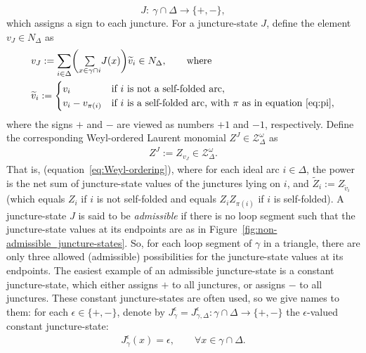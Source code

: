 \documentclass[10pt,a4paper]{amsart}
\numberwithin{equation}{section}
\theoremstyle{definition}
\newcommand{\til}[1]{\widetilde{#1}}
\begin{document}
\[
J \colon \ \gamma \cap \Delta \to \{+,-\},
\]
which assigns a sign to each juncture. For a juncture-state $J$, define the element $v_J \in N_\Delta$ as
\begin{align}
\label{eq:v_J}
&v_J := \sum_{i\in \Delta} \biggl( \underset{x\in \gamma \cap i}{\textstyle \sum} J(x) \biggr) \til{v}_i \in N_\Delta, \qquad \mbox{where} \\
\label{eq:til_v_i}
&\til{v}_i := \begin{cases}
v_i & \mbox{if } i \mbox{ is not a self-folded arc}, \\
v_i - v_{\pi(i)} & \mbox{if } i \mbox{ is a self-folded arc, with } \pi \mbox{ as in equation}~\eqref{eq:pi},
\end{cases}
\end{align}
where the signs $+$ and $-$ are viewed as numbers $+1$ and $-1$, respectively. Define the corresponding Weyl-ordered Laurent monomial $Z^J \in \mathcal{Z}^\omega_\Delta$ as
\begin{align}
\label{eq:Z_J}
Z^J := Z_{v_J} \in \mathcal{Z}^\omega_\Delta.
\end{align}
That is, \smash{$Z^J = \bigl[ \prod_{i \in \Delta} \til{Z}_i^{a_i} \bigr]_{\rm Weyl}$} (equation~\eqref{eq:Weyl-ordering}), where for each ideal arc $i\in \Delta$, the power  is the net sum of juncture-state values of the junctures lying on $i$, and $\til{Z}_i := Z_{\til{v}_i}$ (which equals $Z_i$ if $i$ is not self-folded and equals $Z_i Z_{\pi(i)}$ if $i$ is self-folded).
A juncture-state $J$ is said to be {\em admissible} if there is no loop segment such that the juncture-state values at its endpoints are as in Figure~\ref{fig:non-admissible_juncture-states}. So, for each loop segment of $\gamma$ in a triangle, there are only three allowed (admissible) possibilities for the juncture-state values at its endpoints. The easiest example of an admissible juncture-state is a constant juncture-state, which either assigns $+$ to all junctures, or assigns $-$ to all junctures. These constant juncture-states are often used, so we give names to them: for each $\epsilon \in \{+,-\}$, denote by $J^\epsilon_{\gamma} = J^\epsilon_{\gamma,\Delta} \colon \gamma \cap \Delta \to \{+,-\}$ the $\epsilon$-valued constant juncture-state:
\begin{align}
\label{eq:constant_juncture-state}
J_\gamma^\epsilon(x) = \epsilon, \qquad \forall x\in \gamma \cap \Delta.
\end{align}
\end{document}
